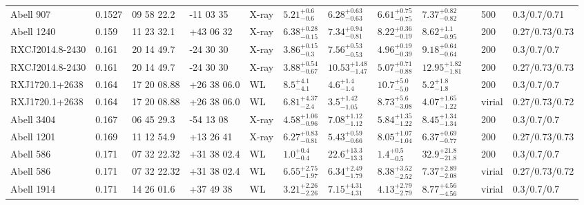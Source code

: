 \begin{landscape}
\begin{center}
{\begin{longtable}{llllllllllll}
Abell 907 & 0.1527 & 09 58 22.2 & -11 03 35 & X-ray & ${5.21}^{+0.6}_{-0.6}$ & ${6.28}^{+0.63}_{-0.63}$ & ${6.61}^{+0.75}_{-0.75}$ & ${7.37}^{+0.82}_{-0.82}$ & \citet{VI06.1} & 500 & 0.3/0.7/0.71 \\
Abell 1240 & 0.159 & 11 23 32.1 & +43 06 32 & X-ray & ${6.38}^{+0.28}_{-0.15}$ & ${7.34}^{+0.94}_{-0.81}$ & ${8.22}^{+0.36}_{-0.19}$ & ${8.62}^{+1.1}_{-0.95}$ & \citet{BA14.1} & 200 & 0.27/0.73/0.73 \\
RXCJ2014.8-2430 & 0.161 & 20 14 49.7 & -24 30 30 & X-ray & ${3.86}^{+0.15}_{-0.3}$ & ${7.56}^{+0.53}_{-0.53}$ & ${4.96}^{+0.19}_{-0.39}$ & ${9.18}^{+0.64}_{-0.64}$ & \citet{ET11.1} & 200 & 0.3/0.7/0.7 \\
RXCJ2014.8-2430 & 0.161 & 20 14 49.7 & -24 30 30 & X-ray & ${3.88}^{+0.54}_{-0.67}$ & ${10.53}^{+1.48}_{-1.47}$ & ${5.07}^{+0.71}_{-0.88}$ & ${12.95}^{+1.82}_{-1.81}$ & \citet{BA14.1} & 200 & 0.27/0.73/0.73 \\
RXJ1720.1+2638 & 0.164 & 17 20 08.88 & +26 38 06.0 & WL & ${8.5}^{+4.1}_{-4.1}$ & ${4.6}^{+1.4}_{-1.4}$ & ${10.7}^{+5.0}_{-5.0}$ & ${5.2}^{+1.8}_{-1.8}$ & \citet{SE14.1} & 200 & 0.3/0.7/0.7 \\
RXJ1720.1+2638 & 0.164 & 17 20 08.88 & +26 38 06.0 & WL & ${6.81}^{+4.37}_{-2.4}$ & ${3.5}^{+1.42}_{-1.05}$ & ${8.73}^{+5.6}_{-3.08}$ & ${4.07}^{+1.65}_{-1.22}$ & \citet{OK10.1} & virial & 0.27/0.73/0.72 \\
Abell 3404 & 0.167 & 06 45 29.3 & -54 13 08 & X-ray & ${4.58}^{+1.06}_{-0.96}$ & ${7.08}^{+1.12}_{-1.12}$ & ${5.84}^{+1.35}_{-1.22}$ & ${8.45}^{+1.34}_{-1.34}$ & \citet{ET11.1} & 200 & 0.3/0.7/0.7 \\
Abell 1201 & 0.169 & 11 12 54.9 & +13 26 41 & X-ray & ${6.27}^{+0.83}_{-0.81}$ & ${5.43}^{+0.59}_{-0.66}$ & ${8.05}^{+1.07}_{-1.04}$ & ${6.37}^{+0.69}_{-0.77}$ & \citet{BA14.1} & 200 & 0.27/0.73/0.73 \\
Abell 586 & 0.171 & 07 32 22.32 & +31 38 02.4 & WL & ${1.0}^{+0.4}_{-0.4}$ & ${22.6}^{+13.3}_{-13.3}$ & ${1.4}^{+0.5}_{-0.5}$ & ${32.9}^{+21.8}_{-21.8}$ & \citet{SE14.1} & 200 & 0.3/0.7/0.7 \\
Abell 586 & 0.171 & 07 32 22.32 & +31 38 02.4 & WL & ${6.55}^{+2.75}_{-1.97}$ & ${6.34}^{+2.49}_{-1.79}$ & ${8.38}^{+3.52}_{-2.52}$ & ${7.37}^{+2.89}_{-2.08}$ & \citet{OK10.1} & virial & 0.27/0.73/0.72 \\
Abell 1914 & 0.171 & 14 26 01.6 & +37 49 38 & WL & ${3.21}^{+2.26}_{-2.26}$ & ${7.15}^{+4.31}_{-4.31}$ & ${4.13}^{+2.79}_{-2.79}$ & ${8.77}^{+4.56}_{-4.56}$ & \citet{OK08.1} & virial & 0.3/0.7/0.7 \\

\end{longtable}}
\end{center}
\end{landscape}
